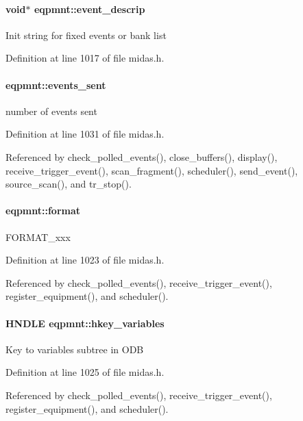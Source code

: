 \paragraph[{event\_\-descrip}]{\setlength{\rightskip}{0pt plus 5cm}void$\ast$ {\bf eqpmnt::event\_\-descrip}}\hfill\label{structeqpmnt_a4cb2c750babcb1eb077ec8151097d0eb}
Init string for fixed events or bank list 

Definition at line 1017 of file midas.h.
\paragraph[{events\_\-sent}]{ {\bf eqpmnt::events\_\-sent}}\hfill\label{structeqpmnt_a448c8840590d36b3a828ff1ec0c8a65c}
number of events sent 

Definition at line 1031 of file midas.h.

Referenced by check\_\-polled\_\-events(), close\_\-buffers(), display(), receive\_\-trigger\_\-event(), scan\_\-fragment(), scheduler(), send\_\-event(), source\_\-scan(), and tr\_\-stop().
\paragraph[{format}]{ {\bf eqpmnt::format}}\hfill\label{structeqpmnt_acad980d7699722234c72bfca6243203b}
FORMAT\_\-xxx 

Definition at line 1023 of file midas.h.

Referenced by check\_\-polled\_\-events(), receive\_\-trigger\_\-event(), register\_\-equipment(), and scheduler().
\paragraph[{hkey\_\-variables}]{\setlength{\rightskip}{0pt plus 5cm}HNDLE {\bf eqpmnt::hkey\_\-variables}}\hfill\label{structeqpmnt_ab6664c255e4c3fdc58806733ac04503b}
Key to variables subtree in ODB 

Definition at line 1025 of file midas.h.

Referenced by check\_\-polled\_\-events(), receive\_\-trigger\_\-event(), register\_\-equipment(), and scheduler().
